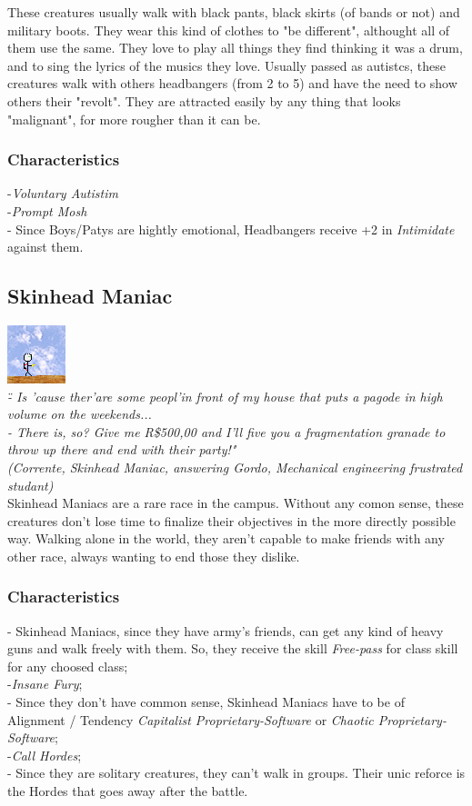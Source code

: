 \documentclass[ letterpaper,12pt]{article}
\begin{document}
These creatures usually walk with black pants, black skirts (of bands or not)
and military boots. They wear this kind of clothes to "be different", althought
all of them use the same. They love to play all things they find thinking it
was a drum, and to sing the lyrics of the musics they love. Usually passed as
autistcs, these creatures walk with others headbangers (from 2 to 5) and have
the need to show others their "revolt". They are attracted easily by any thing
that looks "malignant", for more rougher than it can be.

\subsubsection{Characteristics}
-{\it Voluntary Autistim}\\
-{\it Prompt Mosh}\\
- Since Boys/Patys are hightly emotional, Headbangers receive +2 in {\it Intimidate} against them.

\subsection{Skinhead Maniac}
\includegraphics{../data/races/Img/skin.png}\\
{\it \" - Is 'cause ther'are some peopl'in front of my house that puts a pagode in high volume on the weekends...\\
 - There is, so? Give me R\$500,00 and I'll five you a fragmentation granade to throw up there and end with their party!"\\
(Corrente, Skinhead Maniac, answering Gordo, Mechanical engineering frustrated studant)}\\

Skinhead Maniacs are a rare race in the campus. Without any comon sense, these
creatures don't lose time to finalize their objectives in the more directly
possible way. Walking alone in the world, they aren't capable to make friends
with any other race, always wanting to end those they dislike.

\subsubsection{Characteristics}
- Skinhead Maniacs, since they have army's friends, can get any kind of heavy guns and walk freely with them. So, they receive the skill {\it Free-pass} for class skill for any choosed class;\\
-{\it Insane Fury};\\
- Since they don't have common sense, Skinhead Maniacs have to be of Alignment / Tendency {\it Capitalist Proprietary-Software} or {\it Chaotic Proprietary-Software};\\
-{\it Call Hordes};\\
- Since they are solitary creatures, they can't walk in groups. Their unic reforce is the Hordes that goes away after the battle.
\end{document}
